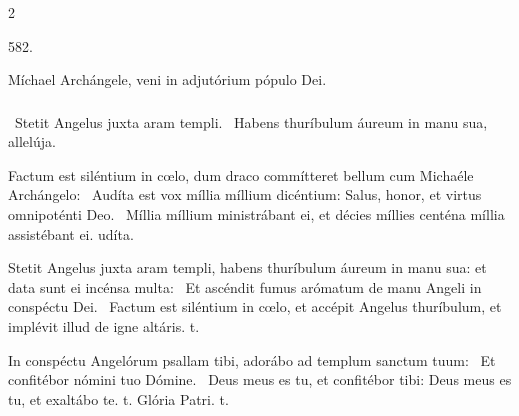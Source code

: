 \documentclass[9pt,twoside]{extarticle}
\begin{document}
\begin{multicols}{2}
\begin{tightlist}{}
\item {} 582.
\item {} Míchael Archángele, veni in adjutórium pópulo Dei.
\item {}
\item {}
\end{tightlist}
\subsubsection*{}
\begin{tightlist}{}
\item {}~Stetit Angelus juxta aram templi. ~Habens thuríbulum áureum in manu sua, allelúja. 
\item {} Factum est siléntium in cœlo, dum draco commítteret bellum cum Michaéle Archángelo: \textred{*}~Audíta est vox míllia míllium dicéntium: Salus, honor, et virtus omnipoténti Deo. ~Míllia míllium ministrábant ei, et décies míllies centéna míllia assistébant ei. udíta.
\item {} Stetit Angelus juxta aram templi, habens thuríbulum áureum in manu sua: et data sunt ei incénsa multa: \textred{*}~Et ascéndit fumus arómatum de manu Angeli in conspéctu Dei. ~Factum est siléntium in cœlo, et accépit Angelus thuríbulum, et implévit illud de igne altáris. t.
\item {} In conspéctu Angelórum psallam tibi, adorábo ad templum sanctum tuum: \textred{*}~Et confitébor nómini tuo Dómine. ~Deus meus es tu, et confitébor tibi: Deus meus es tu, et exaltábo te. t. Glória Patri. t.
\end{tightlist}


\end{multicols}
\end{document}
